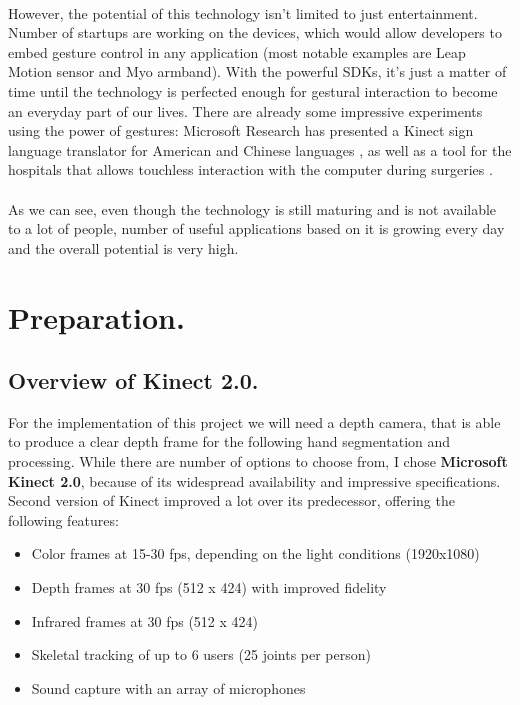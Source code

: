 \documentclass[a4paper,11pt,oneside]{article}
\begin{document}
  \\
  However, the potential of this technology isn't limited to just entertainment. Number of startups are working on the devices, which would allow developers to embed gesture control in any application (most notable examples are Leap Motion sensor and Myo armband). With the powerful SDKs, it's just a matter of time until the technology is perfected enough for gestural interaction to become an everyday part of our lives. There are already some impressive experiments using the power of gestures: Microsoft Research has presented a Kinect sign language translator for American and Chinese languages \cite{MS02}, as well as a tool for the hospitals that allows touchless interaction with the computer during surgeries \cite{MS03}.\\
  \\
  As we can see, even though the technology is still maturing and is not available to a lot of people, number of useful applications based on it is growing every day and the overall potential is very high.

 \section{Preparation.}

\subsection{Overview of Kinect 2.0.}

For the implementation of this project we will need a depth camera, that is able to produce a clear depth frame for the following hand segmentation and processing. While there are number of options to choose from, I chose \textbf{Microsoft Kinect 2.0}, because of its widespread availability and impressive specifications.\\

Second version of Kinect improved a lot over its predecessor, offering the following features:

\begin{itemize}
\item Color frames at 15-30 fps, depending on the light conditions (1920x1080)
\item Depth frames at 30 fps (512 x 424) with improved fidelity
\item Infrared frames at 30 fps (512 x 424)
\item Skeletal tracking of up to 6 users (25 joints per person)
\item Sound capture with an array of microphones
\end{itemize}
\end{document}
